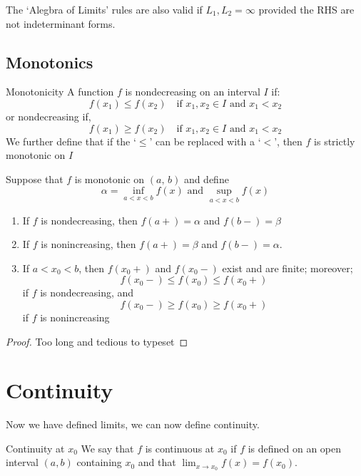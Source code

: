 \documentclass{article}
\renewcommand{\a}{\alpha}
\renewcommand{\b}{\beta}
\begin{document}
{{The `Alegbra of Limits' rules are also valid if $L_1,L_2 = \infty$ provided the RHS are not indeterminant forms.

\subsection{Monotonics}
\noindent\begin{definition}{Monotonicity}{}
A function $f$ is {\color{blue} nondecreasing }on an interval $I$ if:
$$ f(x_1) \le f(x_2) \quad\text{if }x_1,x_2\in I \text{ and }x_1<x_2$$
or {\color{blue} nondecreasing }if,
$$ f(x_1) \ge f(x_2) \quad\text{if }x_1,x_2\in I \text{ and }x_1<x_2$$
We further define that if the `$\le$' can be replaced with a `$<$', then $f$ is strictly monotonic on $I$
\end{definition}\vspace{10pt}

\begin{theorem}{}{}
  Suppose that $f$ is monotonic on $(a,\, b)$ and define
  $$ \a = \inf_{a<x<b}{f(x)} \text{ and } \sup_{a<x<b}{f(x)} $$
  \begin{enumerate}
    \item If $f$ is nondecreasing, then $f(a+)=\a$ and $f(b-)=\b$
    \item If $f$ is nonincreasing, then $f(a+)=\b$ and $f(b-)=\a$.
    \item If $a<x_0<b$, then $f(x_0+)$ and $f(x_0-)$ exist and are finite; moreover;
    $$ f(x_0-) \le f(x_0) \le f(x_0+) $$
    if $f$ is nondecreasing, and
    $$ f(x_0-)\ge f(x_0) \ge f(x_0+) $$
    if $f$ is nonincreasing
  \end{enumerate}
\end{theorem}
\begin{proof}
  Too long and tedious to typeset
\end{proof}

\newpage
\newpage\section{Continuity}
Now we have defined limits, we can now define continuity.\\

\noindent\begin{definition}{Continuity at $x_0$}{}
 We say that $f$ is continuous at $x_0$ if $f$ is defined on an open interval $(a, b)$ containing $x_0$ and that $\lim_{x\to x_0}{f(x)} = f(x_0)$.
\end{definition}\vspace{10pt}

}}
\end{document}
